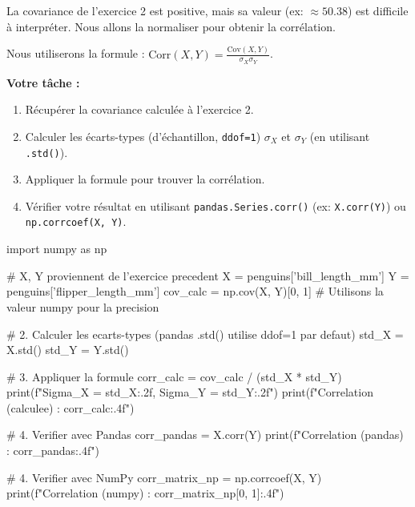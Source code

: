 \begin{exercicebox}
La covariance de l'exercice 2 est positive, mais sa valeur (ex: $\approx 50.38$) est difficile à interpréter. Nous allons la normaliser pour obtenir la corrélation.

Nous utiliserons la formule : $\text{Corr}(X,Y) = \frac{\text{Cov}(X,Y)}{\sigma_X \sigma_Y}$.

\textbf{Votre tâche :}
\begin{enumerate}
    \item Récupérer la covariance calculée à l'exercice 2.
    \item Calculer les écarts-types (d'échantillon, \texttt{ddof=1}) $\sigma_X$ et $\sigma_Y$ (en utilisant \texttt{.std()}).
    \item Appliquer la formule pour trouver la corrélation.
    \item Vérifier votre résultat en utilisant \texttt{pandas.Series.corr()} (ex: \texttt{X.corr(Y)}) ou \texttt{np.corrcoef(X, Y)}.
\end{enumerate}

\begin{codecell}
import numpy as np

# X, Y proviennent de l'exercice precedent
X = penguins['bill_length_mm']
Y = penguins['flipper_length_mm']
cov_calc = np.cov(X, Y)[0, 1] # Utilisons la valeur numpy pour la precision

# 2. Calculer les ecarts-types (pandas .std() utilise ddof=1 par defaut)
std_X = X.std()
std_Y = Y.std()

# 3. Appliquer la formule
corr_calc = cov_calc / (std_X * std_Y)
print(f"Sigma_X = {std_X:.2f}, Sigma_Y = {std_Y:.2f}")
print(f"Correlation (calculee) : {corr_calc:.4f}")

# 4. Verifier avec Pandas
corr_pandas = X.corr(Y)
print(f"Correlation (pandas)   : {corr_pandas:.4f}")

# 4. Verifier avec NumPy
corr_matrix_np = np.corrcoef(X, Y)
print(f"Correlation (numpy)    : {corr_matrix_np[0, 1]:.4f}")
\end{codecell}
\end{exercicebox}

